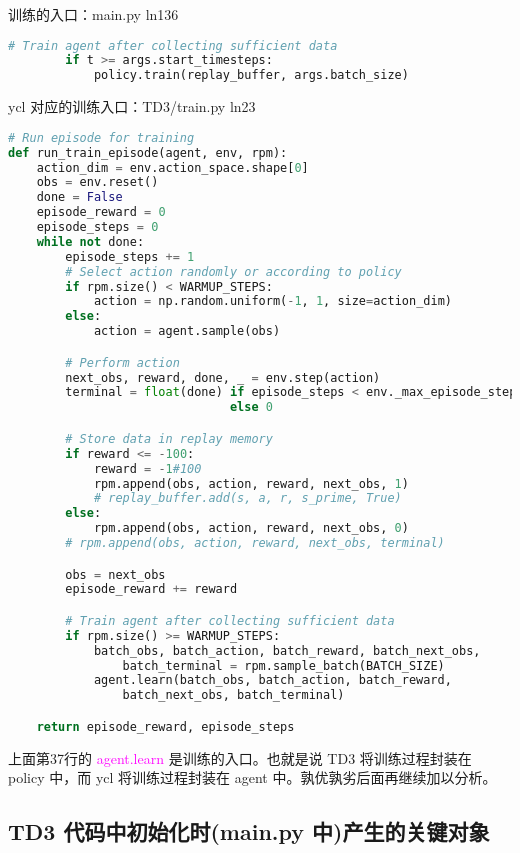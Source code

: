 训练的入口：main.py ln136
\begin{lstlisting}[language=Python]
		# Train agent after collecting sufficient data
		if t >= args.start_timesteps:
			policy.train(replay_buffer, args.batch_size)
\end{lstlisting}

ycl 对应的训练入口：TD3/train.py ln23
\begin{lstlisting}[language=Python]
# Run episode for training
def run_train_episode(agent, env, rpm):
    action_dim = env.action_space.shape[0]
    obs = env.reset()
    done = False
    episode_reward = 0
    episode_steps = 0
    while not done:
        episode_steps += 1
        # Select action randomly or according to policy
        if rpm.size() < WARMUP_STEPS:
            action = np.random.uniform(-1, 1, size=action_dim)
        else:
            action = agent.sample(obs)

        # Perform action
        next_obs, reward, done, _ = env.step(action)
        terminal = float(done) if episode_steps < env._max_episode_steps 
                               else 0

        # Store data in replay memory
        if reward <= -100:
            reward = -1#100
            rpm.append(obs, action, reward, next_obs, 1)
            # replay_buffer.add(s, a, r, s_prime, True)
        else:
            rpm.append(obs, action, reward, next_obs, 0)
        # rpm.append(obs, action, reward, next_obs, terminal)

        obs = next_obs
        episode_reward += reward

        # Train agent after collecting sufficient data
        if rpm.size() >= WARMUP_STEPS:
            batch_obs, batch_action, batch_reward, batch_next_obs, 
                batch_terminal = rpm.sample_batch(BATCH_SIZE)
            agent.learn(batch_obs, batch_action, batch_reward, 
                batch_next_obs, batch_terminal)

    return episode_reward, episode_steps
\end{lstlisting}

上面第37行的 \textcolor{magenta}{agent.learn} 是训练的入口。也就是说 TD3 将训练过程封装在 
policy 中，而 ycl 将训练过程封装在 agent 中。孰优孰劣后面再继续加以分析。

\subsection{TD3 代码中初始化时(main.py 中)产生的关键对象}

